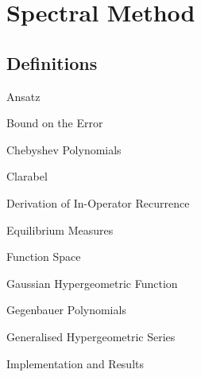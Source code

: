 \chapter{Spectral Method}
\label{chap:spectral-method}

\section{Definitions}


\begin{definition}{Ansatz}{}\end{definition}
\begin{definition}{Bound on the Error}{}\end{definition}
\begin{definition}{Chebyshev Polynomials}{}\end{definition}
\begin{definition}{Clarabel}{}\end{definition}
\begin{definition}{Derivation of In-Operator Recurrence}{}\end{definition}
\begin{definition}{Equilibrium Measures}{}\end{definition}
\begin{definition}{Function Space}{}\end{definition}
\begin{definition}{Gaussian Hypergeometric Function}{}\end{definition}
\begin{definition}{Gegenbauer Polynomials}{}\end{definition}
\begin{definition}{Generalised Hypergeometric Series}{}\end{definition}
\begin{definition}{Implementation and Results}{}\end{definition}
